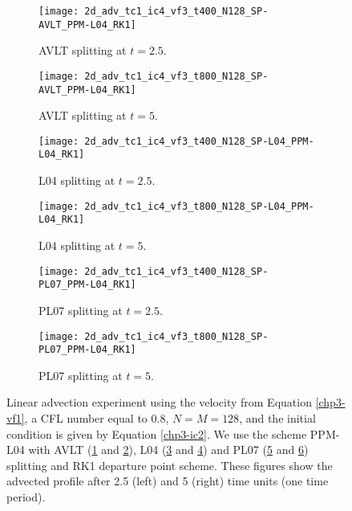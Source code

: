 \begin{figure}[!htb]
	\centering
	\begin{subfigure}{0.4\textwidth}
		\centering
		\texttt{[image: 2d\_adv\_tc1\_ic4\_vf3\_t400\_N128\_SP-AVLT\_PPM-L04\_RK1]}
		\caption{AVLT splitting at $t=2.5$.\label{chp3-sec-exp-adv2-a}}
	\end{subfigure}
	\begin{subfigure}{0.4\textwidth}
		\centering
		\texttt{[image: 2d\_adv\_tc1\_ic4\_vf3\_t800\_N128\_SP-AVLT\_PPM-L04\_RK1]}
		\caption{AVLT splitting at $t=5$.\label{chp3-sec-exp-adv2-b}}
	\end{subfigure}
	
	\begin{subfigure}{0.4\textwidth}
		\centering
		\texttt{[image: 2d\_adv\_tc1\_ic4\_vf3\_t400\_N128\_SP-L04\_PPM-L04\_RK1]}
		\caption{L04 splitting at $t=2.5$.\label{chp3-sec-exp-adv2-c}}
	\end{subfigure}
	\begin{subfigure}{0.4\textwidth}
		\centering
		\texttt{[image: 2d\_adv\_tc1\_ic4\_vf3\_t800\_N128\_SP-L04\_PPM-L04\_RK1]}
		\caption{L04 splitting at $t=5$.\label{chp3-sec-exp-adv2-d}}
	\end{subfigure} 
	
	\begin{subfigure}{0.4\textwidth}
		\centering
		\texttt{[image: 2d\_adv\_tc1\_ic4\_vf3\_t400\_N128\_SP-PL07\_PPM-L04\_RK1]}
		\caption{PL07 splitting at $t=2.5$.\label{chp3-sec-exp-adv2-e}}
	\end{subfigure}
	\begin{subfigure}{0.4\textwidth}
		\centering
		\texttt{[image: 2d\_adv\_tc1\_ic4\_vf3\_t800\_N128\_SP-PL07\_PPM-L04\_RK1]}
		\caption{PL07 splitting at $t=5$.\label{chp3-sec-exp-adv2-f}}
	\end{subfigure} 
	\caption{Linear advection experiment using the velocity from Equation \eqref{chp3-vf1},
	a CFL number equal to $0.8$, $N=M=128$, and the initial condition is given by Equation \eqref{chp3-ic2}.
	We use the scheme PPM-L04 with AVLT  (\ref{chp3-sec-exp-adv2-a} and \ref{chp3-sec-exp-adv2-b}),
    L04 (\ref{chp3-sec-exp-adv2-c} and \ref{chp3-sec-exp-adv2-d}) and PL07 
    (\ref{chp3-sec-exp-adv2-e} and \ref{chp3-sec-exp-adv2-f}) splitting and RK1 departure point scheme.
	These figures show the advected profile after 2.5 (left) and 5  (right) time units (one time period).
	\label{chp3-sec-exp-adv2}}	
\end{figure}

